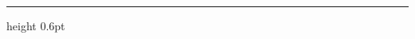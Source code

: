 \begin{titlepage}
\begin{center}
\begin{minipage}{0.9\textwidth}
        \vspace{0.35cm}
        {\color{dividerline}\hrule height 0.6pt}
    \end{minipage}

    \vfill

    {\fontsize{11pt}{14pt}\selectfont \submissiondate \par}
    \vspace*{0.2cm}
\end{center}

\end{titlepage}
